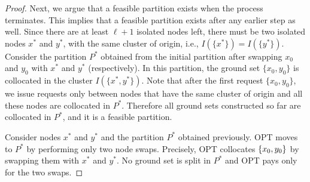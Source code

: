 \documentclass[a4paper,anonymous,USenglish]{lipics-v2019}
\newcommand{\OPT}{\textsc{OPT}\xspace}
\newcommand{\ALG}{\textsc{ALG}\xspace}
\DeclarePairedDelimiter\set{\{}{\}}
\begin{document}
\begin{proof}
	  Next, we argue that a feasible partition exists when the process terminates.
	 This implies that a feasible partition exists after any earlier step as well.
	 Since there are at least $\ell+1$ isolated nodes left,
	 there must be two isolated nodes $x^*$ and $y^*$,
	  with the same cluster of origin,
	 i.e., $I(\{x^*\}) = I(\{y^*\})$.
	 Consider the partition $P^*$
	  obtained from the initial partition after swapping $x_0$ and $y_0$
	 with $x^*$ and $y^*$ (respectively).
	 In this partition,
	 the ground set $\{x_0,y_0\}$ is collocated in the cluster $I(\{x^*,y^*\})$.
	 Note that after the first request $\{x_0,y_0\}$,
	   we issue requests only between nodes that have the same cluster of origin and
	   all these nodes are collocated in $P^*$.
	 Therefore all ground sets constructed so far are collocated in  $P^*$,
	 and it is a feasible partition.
	
%

	Consider  nodes $x^*$ and $y^*$ and the partition $P^*$ obtained previously.
	\OPT moves to $P^*$ by performing only two node swaps.
	Precisely, \OPT collocates $\set{x_0,y_0}$ 
	by swapping them with $x^*$ and $y^*$.
	No ground set is split in $P^*$ and
	 \OPT pays only for the two swaps.


\end{proof}
\end{document}
